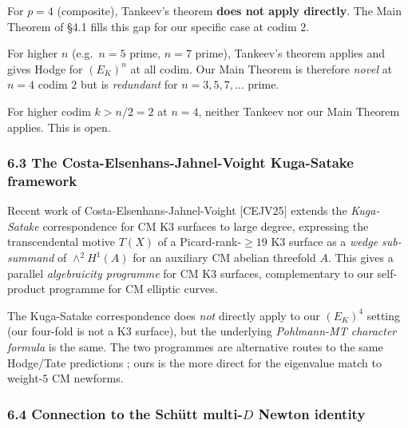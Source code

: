 \documentclass[
  11pt,
  a4paper,
]{amsart}
\begin{document}
For \(p = 4\) (composite), Tankeev's theorem \textbf{does not apply directly}. The Main Theorem of §4.1 fills this gap for our specific case at codim \(2\).

For higher \(n\) (e.g.~\(n = 5\) prime, \(n = 7\) prime), Tankeev's theorem applies and gives Hodge for \((E_K)^n\) at all codim. Our Main Theorem is therefore \emph{novel} at \(n = 4\) codim \(2\) but is \emph{redundant} for \(n = 3, 5, 7, \ldots\) prime.

For higher codim \(k > n/2 = 2\) at \(n = 4\), neither Tankeev nor our Main Theorem applies. This is open.

\hypertarget{the-costa-elsenhans-jahnel-voight-kuga-satake-framework}{%
\subsubsection{6.3 The Costa-Elsenhans-Jahnel-Voight Kuga-Satake framework}\label{the-costa-elsenhans-jahnel-voight-kuga-satake-framework}}

Recent work of Costa-Elsenhans-Jahnel-Voight {[}CEJV25{]} extends the \emph{Kuga-Satake} correspondence for CM K3 surfaces to large degree, expressing the transcendental motive \(T(X)\) of a Picard-rank-\(\geq 19\) K3 surface as a \emph{wedge sub-summand} of \(\wedge^2 H^1(A)\) for an auxiliary CM abelian threefold \(A\). This gives a parallel \emph{algebraicity programme} for CM K3 surfaces, complementary to our self-product programme for CM elliptic curves.

The Kuga-Satake correspondence does \emph{not} directly apply to our \((E_K)^4\) setting (our four-fold is not a K3 surface), but the underlying \emph{Pohlmann-MT character formula} is the same. The two programmes are alternative routes to the same Hodge/Tate predictions ; ours is the more direct for the eigenvalue match to weight-\(5\) CM newforms.

\hypertarget{connection-to-the-schuxfctt-multi-d-newton-identity}{%
\subsubsection{\texorpdfstring{6.4 Connection to the Schütt multi-\(D\) Newton identity}{6.4 Connection to the Schütt multi-D Newton identity}}\label{connection-to-the-schuxfctt-multi-d-newton-identity}}
\end{document}

